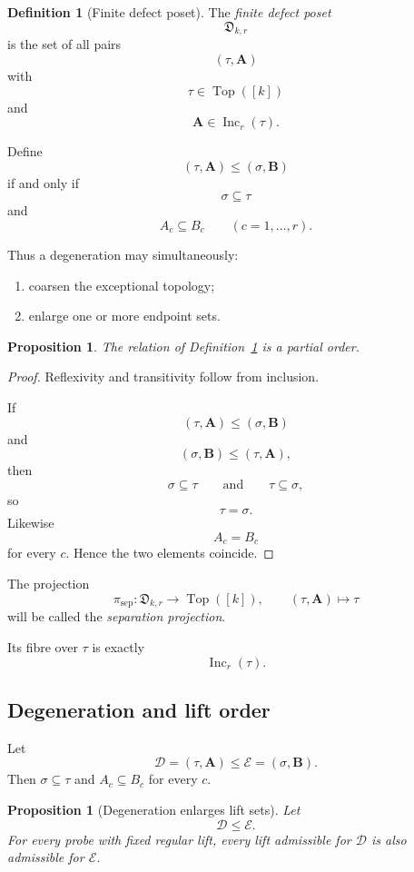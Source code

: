 \documentclass[11pt]{article}
\theoremstyle{plain}
\newtheorem{proposition}[theorem]{Proposition}
\theoremstyle{definition}
\newtheorem{definition}[theorem]{Definition}
\begin{document}
\begin{definition}[Finite defect poset]
\label{def:finite-defect-poset}
The \emph{finite defect poset}
\[
\mathfrak D_{k,r}
\]
is the set of all pairs
\[
(\tau,\mathbf A)
\]
with
\[
\tau\in\operatorname{Top}([k])
\]
and
\[
\mathbf A\in\operatorname{Inc}_r(\tau).
\]

Define
\[
(\tau,\mathbf A)
\leq
(\sigma,\mathbf B)
\]
if and only if
\[
\sigma\subseteq\tau
\]
and
\[
A_c\subseteq B_c
\qquad
(c=1,\ldots,r).
\]
\end{definition}

Thus a degeneration may simultaneously:

\begin{enumerate}[label=(\roman*)]
\item coarsen the exceptional topology;
\item enlarge one or more endpoint sets.
\end{enumerate}

\begin{proposition}
\label{prop:defect-poset}
The relation of
Definition~\ref{def:finite-defect-poset}
is a partial order.
\end{proposition}

\begin{proof}
Reflexivity and transitivity follow from inclusion.

If
\[
(\tau,\mathbf A)\leq(\sigma,\mathbf B)
\]
and
\[
(\sigma,\mathbf B)\leq(\tau,\mathbf A),
\]
then
\[
\sigma\subseteq\tau
\qquad\text{and}\qquad
\tau\subseteq\sigma,
\]
so
\[
\tau=\sigma.
\]
Likewise
\[
A_c=B_c
\]
for every $c$.  Hence the two elements coincide.
\end{proof}

The projection
\[
\pi_{\mathrm{sep}}:
\mathfrak D_{k,r}
\longrightarrow
\operatorname{Top}([k]),
\qquad
(\tau,\mathbf A)\longmapsto\tau
\]
will be called the \emph{separation projection}.

Its fibre over $\tau$ is exactly
\[
\operatorname{Inc}_r(\tau).
\]

\subsection{Degeneration and lift order}
\label{subsec:defect-lift-order}

Let
\[
\mathcal D=(\tau,\mathbf A)
\leq
\mathcal E=(\sigma,\mathbf B).
\]
Then $\sigma\subseteq\tau$ and $A_c\subseteq B_c$ for every $c$.

\begin{proposition}[Degeneration enlarges lift sets]
\label{prop:degeneration-enlarges-lifts}
Let
\[
\mathcal D\leq\mathcal E.
\]
For every probe with fixed regular lift, every lift admissible for
$\mathcal D$ is also admissible for $\mathcal E$.
\end{proposition}
\end{document}
